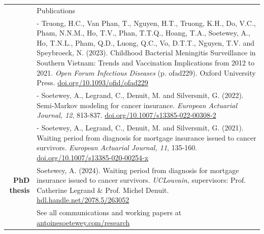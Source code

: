 \documentclass[letterpaper, 11pt]{article}
\newcommand{\headingfont}{\Large\color{OliveGreen}}
\newenvironment{SectionTableSingleSpace}[1]{
	\renewcommand*{\arraystretch}{1.2}
	\setlength{\tabcolsep}{10pt}
	\begin{longtable}{Rp{5.2in}} & #1 \\[0.6em]}
{\end{longtable}\vspace{-.3cm}}
\begin{document}
\begin{SectionTableSingleSpace}{\headingfont Publications}
& - Truong, H.C., Van Phan, T., Nguyen, H.T., Truong, K.H., Do, V.C., Pham, N.N.M., Ho, T.V., Phan, T.T.Q., Hoang, T.A., Soetewey, A., Ho, T.N.L., Pham, Q.D., Luong, Q.C., Vo, D.T.T., Nguyen, T.V. and Speybroeck, N. (2023). Childhood Bacterial Meningitis Surveillance in Southern Vietnam: Trends and Vaccination Implications from 2012 to 2021. \textit{Open Forum Infectious Diseases} (p. ofad229). Oxford University Press. \href{https://doi.org/10.1093/ofid/ofad229}{doi.org/10.1093/ofid/ofad229}\\
& - Soetewey, A., Legrand, C., Denuit, M. and Silversmit, G. (2022). Semi-Markov modeling for cancer insurance. \textit{European Actuarial Journal, 12}, 813-837. \href{https://doi.org/10.1007/s13385-022-00308-2}{doi.org/10.1007/s13385-022-00308-2}\\
& - Soetewey, A., Legrand, C., Denuit, M. and Silversmit, G. (2021). Waiting period from diagnosis for mortgage insurance issued to cancer survivors. \textit{European Actuarial Journal, 11}, 135-160. \href{https://doi.org/10.1007/s13385-020-00254-x}{doi.org/10.1007/s13385-020-00254-x}\newline\\

\textbf{PhD thesis}
& Soetewey, A. (2024). Waiting period from diagnosis for mortgage insurance issued to cancer survivors. \textit{UCLouvain}, supervisors: Prof. Catherine Legrand \& Prof. Michel Denuit. \href{https://hdl.handle.net/2078.5/263052}{hdl.handle.net/2078.5/263052}\newline\\

& See all communications and working papers at \href{https://antoinesoetewey.com/research/}{antoinesoetewey.com/research}
\end{SectionTableSingleSpace}

\end{document}
